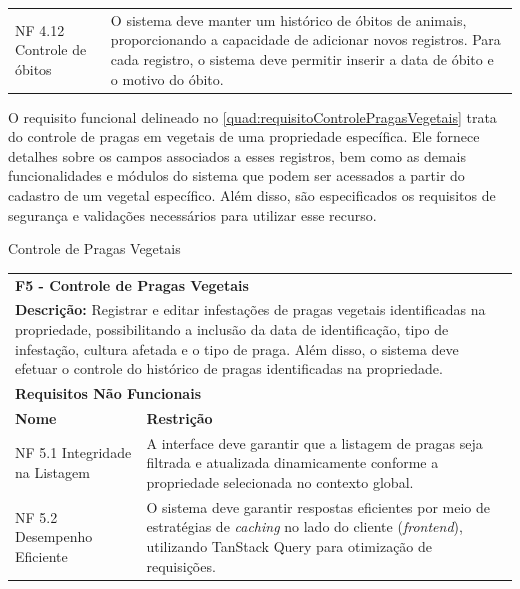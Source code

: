 \begin{tabframed}[!htb]
\begin{tabular}{|l|l|}
    \multicolumn{1}{|p{3cm}|}{\raggedright NF 4.12 Controle de óbitos}      &
    \multicolumn{1}{|p{12cm}|}{\raggedright O sistema deve manter um histórico de óbitos de animais, proporcionando a capacidade de adicionar novos registros. Para cada registro, o sistema deve permitir inserir a data de óbito e o motivo do óbito.}
    \\ \cline{1-2}
  \end{tabular}
  \fonte{} %
\end{tabframed}

\clearpage

O requisito funcional delineado no \autoref{quad:requisitoControlePragasVegetais} trata do controle de pragas em vegetais de uma propriedade específica. Ele fornece detalhes sobre os campos associados a esses registros, bem como as demais funcionalidades e módulos do sistema que podem ser acessados a partir do cadastro de um vegetal específico. Além disso, são especificados os requisitos de segurança e validações necessários para utilizar esse recurso.

\begin{tabframed}[htb]
  \caption{Controle de Pragas Vegetais}
  \label{quad:requisitoControlePragasVegetais}
  \renewcommand{\arraystretch}{1.5}
  \begin{tabular}{|l|l|}
    \cline{1-2}
    \multicolumn{2}{|l|}{\textbf{F5 - Controle de Pragas Vegetais}}
    \\ \cline{1-2}

    \multicolumn{2}{|p{15cm}|}{
    \raggedright \textbf{Descrição:} Registrar e editar infestações de pragas vegetais identificadas na propriedade, possibilitando a inclusão da data de identificação, tipo de infestação, cultura afetada e o tipo de praga. Além disso, o sistema deve efetuar o controle do histórico de pragas identificadas na propriedade.
    }
    \\ \cline{1-2}

    \multicolumn{2}{|l|}{\textbf{Requisitos Não Funcionais}}
    \\ \cline{1-2}

    \textbf{Nome}               &
    \textbf{Restrição}
    \\ \cline{1-2}

    NF 5.1 Integridade na Listagem  &
    \multicolumn{1}{|p{8cm}|}{\raggedright A interface deve garantir que a listagem de pragas seja filtrada e atualizada dinamicamente conforme a propriedade selecionada no contexto global.}
    \\ \cline{1-2}

    NF 5.2 Desempenho Eficiente &
    \multicolumn{1}{|p{8cm}|}{\raggedright O sistema deve garantir respostas eficientes por meio de estratégias de \textit{caching} no lado do cliente (\textit{frontend}), utilizando TanStack Query para otimização de requisições.}
    \\ \cline{1-2}
  \end{tabular}
  \fonte{} %
\end{tabframed}

